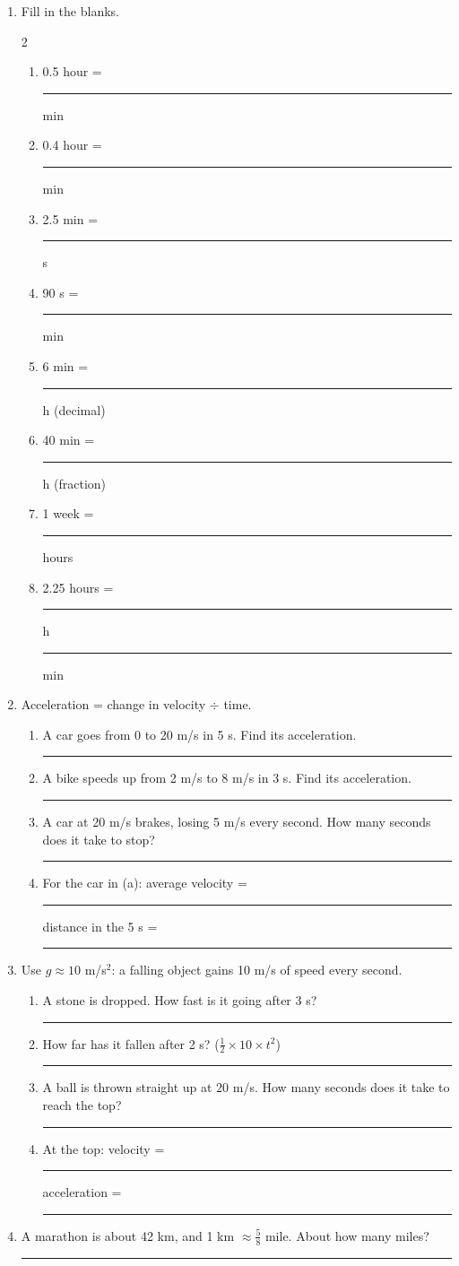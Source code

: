\documentclass[12pt, twoside]{article}
\newcommand{\blank}[1][2.4cm]{\rule{#1}{0.4pt}}
\begin{document}
\begin{enumerate}[itemsep=0.35cm]
\item Fill in the blanks.
  \begin{multicols}{2}
    \begin{enumerate}[itemsep=0.42cm]
      \item 0.5 hour = \blank[1.8cm] min
      \item 0.4 hour = \blank[1.8cm] min
      \item 2.5 min = \blank[1.8cm] s
      \item 90 s = \blank[1.8cm] min
      \item 6 min = \blank[1.8cm] h (decimal)
      \item 40 min = \blank[1.8cm] h (fraction)
      \item 1 week = \blank[1.8cm] hours
      \item 2.25 hours = \blank[1.2cm] h \blank[1.2cm] min
    \end{enumerate}
  \end{multicols}

\item Acceleration = change in velocity $\div$ time.
  \begin{enumerate}[itemsep=0.42cm]
    \item A car goes from 0 to 20 m/s in 5 s. Find its acceleration. \hfill \blank
    \item A bike speeds up from 2 m/s to 8 m/s in 3 s. Find its acceleration.
      \hfill \blank
    \item A car at 20 m/s brakes, losing 5 m/s every second. How many seconds
      does it take to stop? \hfill \blank
    \item For the car in (a): average velocity = \blank[1.8cm] \hfill distance in
      the 5 s = \blank[1.8cm]
  \end{enumerate}

\item Use $g \approx 10$ m/s$^2$: a falling object gains 10 m/s of speed every second.
  \begin{enumerate}[itemsep=0.42cm]
    \item A stone is dropped. How fast is it going after 3 s? \hfill \blank
    \item How far has it fallen after 2 s? \; ($\frac{1}{2} \times 10 \times t^2$)
      \hfill \blank
    \item A ball is thrown straight up at 20 m/s. How many seconds does it take to
      reach the top? \hfill \blank
    \item At the top: velocity = \blank[1.8cm] \hfill acceleration =
      \blank[1.8cm]
  \end{enumerate}

\item A marathon is about 42 km, and 1 km $\approx \frac{5}{8}$ mile. About how many miles?
  \hfill \blank

\end{enumerate}
\end{document}
